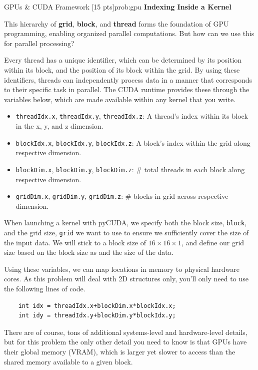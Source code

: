 \begin{problem}{GPUs \& CUDA Framework \hfill[15 pts]}{prob:gpu}
    \newpage
    \textbf{Indexing Inside a Kernel}

    This hierarchy of \textbf{grid}, \textbf{block}, and \textbf{thread} forms the foundation of GPU programming, enabling organized parallel computations. But how can we use this for parallel processing?

    \vspace{10px}
    Every thread has a unique identifier, which can be determined by its position within its block, and the position of its block within the grid. By using these identifiers, threads can independently process data in a manner that corresponds to their specific task in parallel. The CUDA runtime provides these through the variables below, which are made available within any kernel that you write.

    \begin{itemize}
        \item \texttt{threadIdx.x}, \texttt{threadIdx.y}, \texttt{threadIdx.z}: A thread's index within its block in the x, y, and z dimension.
        \item \texttt{blockIdx.x}, \texttt{blockIdx.y}, \texttt{blockIdx.z}: A block's index within the grid along respective dimension.
        \item \texttt{blockDim.x}, \texttt{blockDim.y}, \texttt{blockDim.z}: \# total threads in each block along respective dimension.
        \item \texttt{gridDim.x}, \texttt{gridDim.y}, \texttt{gridDim.z}: \# blocks in grid across respective dimension. 
    \end{itemize}

    When launching a kernel with pyCUDA, we specify both the block size, \texttt{block}, and the grid size, \texttt{grid} we want to use to ensure we sufficiently cover the size of the input data. We will stick to a block size of $16 \times 16 \times 1$, and define our grid size based on the block size as and the size of the data.

    \vspace{10px}
    Using these variables, we can map locations in memory to physical hardware cores. As this problem will deal with 2D structures only, you'll only need to use the following lines of code.

    \begin{verbatim}
    int idx = threadIdx.x+blockDim.x*blockIdx.x;
    int idy = threadIdx.y+blockDim.y*blockIdx.y;\end{verbatim}
    There are of course, tons of additional systems-level and hardware-level details, but for this problem the only other detail you need to know is that GPUs have their global memory (VRAM), which is larger yet slower to access than the shared memory available to a given block.


\end{problem}
